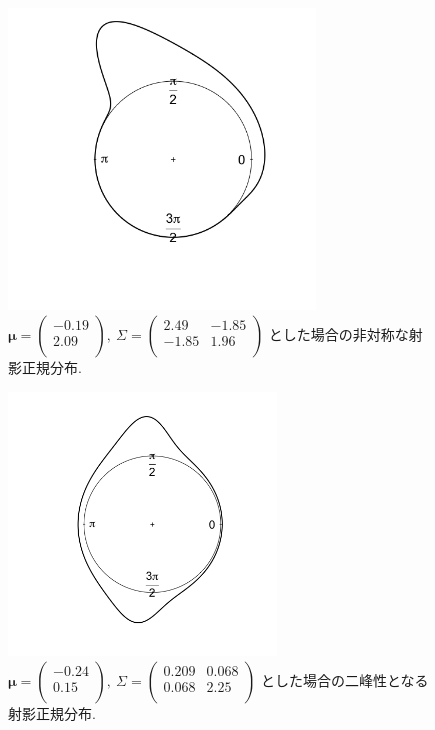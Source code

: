 \documentclass[a4j,12pt]{jarticle}
\begin{document}
\begin{figure}[tbp]  
\begin{center}
\includegraphics[clip,height= 80mm]{data/sample_asymmetry.png}
\caption[非対称な射影正規分布]{
$\bm \mu = \begin{pmatrix} -0.19 \\ 2.09 \\ \end{pmatrix}, \ \Sigma = \begin{pmatrix} 2.49 & -1.85 \\ -1.85 & 1.96 \\ \end{pmatrix}$ とした場合の非対称な射影正規分布.}
\label{sample_pnc2}
\end{center}
\end{figure}

\begin{figure}[tbp]  
\begin{center}
\includegraphics[clip,height= 70mm]{data/sample_bimodal.png}
\caption[二峰性となる射影正規分布]{
$\bm \mu = \begin{pmatrix} -0.24 \\ 0.15 \\ \end{pmatrix}, \ \Sigma = \begin{pmatrix} 0.209 & 0.068\\ 0.068 & 2.25 \\ \end{pmatrix}$ とした場合の二峰性となる射影正規分布.}
\label{sample_pnc3}
\end{center}
\end{figure}
\end{document}
